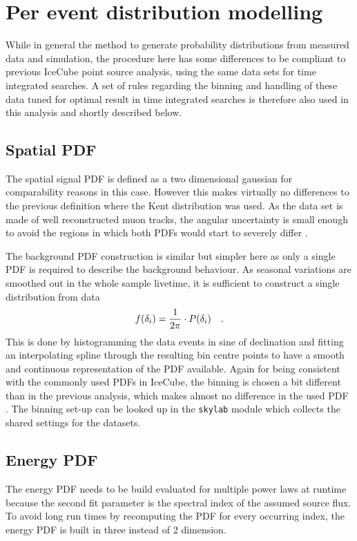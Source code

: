 \section{Per event distribution modelling}
While in general the method to generate probability distributions from measured data and simulation, the procedure here has some differences to be compliant to previous IceCube point source analysis, using the same data sets for time integrated searches.
A set of rules regarding the binning and handling of these data tuned for optimal result in time integrated searches is therefore also used in this analysis and shortly described below.

\subsection*{Spatial PDF}
The spatial signal PDF is defined as a two dimensional gaussian for comparability reasons in this case.
However this makes virtually no differences to the previous definition where the Kent distribution was used.
As the data set is made of well reconstructed muon tracks, the angular uncertainty is small enough to avoid the regions in which both PDFs would start to severely differ .

The background PDF construction is similar but simpler here as only a single PDF is required to describe the background behaviour.
As seasonal variations are smoothed out in the whole sample livetime, it is sufficient to construct a single distribution from data
\begin{equation}
  f(\delta_i) = \frac{1}{2\pi}\cdot P(\delta_i)
  \quad\text{.}
\end{equation}
This is done by histogramming the data events in sine of declination and fitting an interpolating spline through the resulting bin centre points to have a smooth and continuous representation of the PDF available.
Again for being consistent with the commonly used PDFs in IceCube, the binning is chosen a bit different than in the previous analysis, which makes almost no difference in the used PDF .
The binning set-up can be looked up in the \lstinline!skylab! module which collects the shared settings for the datasets.

\subsection*{Energy PDF}
The energy PDF needs to be build evaluated for multiple power laws at runtime because the second fit parameter is the spectral index of the assumed source flux.
To avoid long run times by recomputing the PDF for every occurring index, the energy PDF is built in three instead of 2 dimension.

